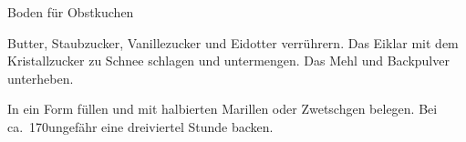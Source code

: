 \begin{recipe}{Boden für Obstkuchen}

    \begin{ingredients}
    \end{ingredients}

    \begin{instructions}
        Butter, Staubzucker, Vanillezucker und Eidotter verrührern.
        Das Eiklar mit dem Kristallzucker zu Schnee schlagen und untermengen.
        Das Mehl und Backpulver unterheben.

        In ein Form füllen und mit halbierten Marillen oder Zwetschgen belegen.
        Bei ca.~170\degC ungefähr eine dreiviertel Stunde backen.
    \end{instructions}
\end{recipe}
